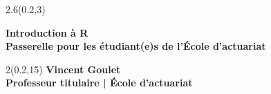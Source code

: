\begingroup

\textblockorigin{0mm}{0mm}
\begin{frame}[plain]
  \begin{textblock*}{2.6\TPHorizModule}(0.2\TPHorizModule,3\TPVertModule)
    \raggedright%
    \bfseries
    \fontsize{30}{30}\selectfont
    Introduction à R \\
    \mdseries
    \fontsize{14}{18}\selectfont
    Passerelle pour les étudiant(e)s de l'École d'actuariat
  \end{textblock*}

  \begin{textblock*}{2\TPHorizModule}(0.2\TPHorizModule,15\TPVertModule)
    \fontsize{10}{11}\selectfont
    \bfseries
    Vincent Goulet \\
    \fontsize{9}{11}\selectfont
    \mdseries
    Professeur titulaire | École d'actuariat
  \end{textblock*}
\end{frame}
\endgroup

